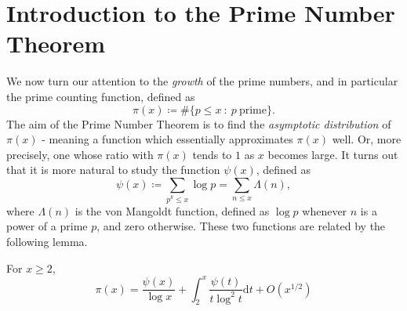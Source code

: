 \section{Introduction to the Prime Number Theorem}
We now turn our attention to the \textit{growth} of the prime numbers, and in particular the prime counting function, defined as
\begin{equation}
    \pi(x) \coloneqq \# \{p \leq x \ : \ p \ \textrm{prime}\}. \nonumber
\end{equation}
The aim of the Prime Number Theorem is to find the \textit{asymptotic distribution} of $\pi(x)$ - meaning a function which essentially approximates $\pi(x)$ well. Or, more precisely, one whose ratio with $\pi(x)$ tends to $1$ as $x$ becomes large. It turns out that it is more natural to study the function $\psi(x)$, defined as 
\begin{equation}
    \psi(x) \coloneqq \sum_{p^{k} \leq x} \log p = \sum_{n \leq x} \Lambda(n), \nonumber
\end{equation}
where $\Lambda(n)$ is the von Mangoldt function, defined as $\log p$ whenever $n$ is a power of a prime $p$, and zero otherwise. These two functions are related by the following lemma.
\begin{lemma}
\label{PsiPiRelationLemma}
 For $x \geq 2$, 
\begin{equation}
\pi(x) = \frac{\psi(x)}{\log x} + \int_{2}^{x} \frac{\psi(t)}{t \log^{2} t} \mathrm{d} t + O(x^{1/2})
\end{equation}
\end{lemma}

